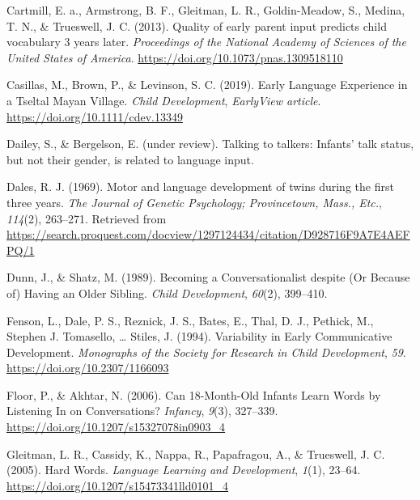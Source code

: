 \documentclass[
  man,floatsintext]{apa6}
\newlength{\cslhangindent}
\newlength{\cslentryspacingunit} %
\newenvironment{CSLReferences}[2] %
 {%
  \setlength{\parindent}{0pt}
  \ifodd #1
  \let\oldpar\par
  \def\par{\hangindent=\cslhangindent\oldpar}
  \fi
  \setlength{\parskip}{#2\cslentryspacingunit}
 }%
 {}
\begin{document}
\begin{CSLReferences}{1}{0}
\leavevmode{}%
Cartmill, E. a., Armstrong, B. F., Gleitman, L. R., Goldin-Meadow, S., Medina, T. N., \& Trueswell, J. C. (2013). Quality of early parent input predicts child vocabulary 3 years later. \emph{Proceedings of the National Academy of Sciences of the United States of America}. \url{https://doi.org/10.1073/pnas.1309518110}

\leavevmode{}%
Casillas, M., Brown, P., \& Levinson, S. C. (2019). Early {Language} {Experience} in a {Tseltal} {Mayan} {Village}. \emph{Child Development}, \emph{EarlyView article}. \url{https://doi.org/10.1111/cdev.13349}

\leavevmode{}%
Dailey, S., \& Bergelson, E. (under review). Talking to talkers: {Infants}' talk status, but not their gender, is related to language input.

\leavevmode{}%
Dales, R. J. (1969). Motor and language development of twins during the first three years. \emph{The Journal of Genetic Psychology; Provincetown, Mass., Etc.}, \emph{114}(2), 263--271. Retrieved from \url{https://search.proquest.com/docview/1297124434/citation/D928716F9A7E4AEFPQ/1}

\leavevmode{}%
Dunn, J., \& Shatz, M. (1989). Becoming a {Conversationalist} despite ({Or} {Because} of) {Having} an {Older} {Sibling}. \emph{Child Development}, \emph{60}(2), 399--410.

\leavevmode{}%
Fenson, L., Dale, P. S., Reznick, J. S., Bates, E., Thal, D. J., Pethick, M., Stephen J. Tomasello, \ldots{} Stiles, J. (1994). Variability in {Early} {Communicative} {Development}. \emph{Monographs of the Society for Research in Child Development}, \emph{59}. \url{https://doi.org/10.2307/1166093}

\leavevmode{}%
Floor, P., \& Akhtar, N. (2006). Can 18-{Month}-{Old} {Infants} {Learn} {Words} by {Listening} {In} on {Conversations}? \emph{Infancy}, \emph{9}(3), 327--339. \url{https://doi.org/10.1207/s15327078in0903_4}

\leavevmode{}%
Gleitman, L. R., Cassidy, K., Nappa, R., Papafragou, A., \& Trueswell, J. C. (2005). Hard {Words}. \emph{Language Learning and Development}, \emph{1}(1), 23--64. \url{https://doi.org/10.1207/s15473341lld0101_4}


\end{CSLReferences}
\end{document}
